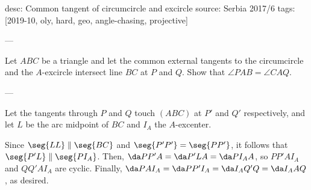 desc: Common tangent of circumcircle and excircle
source: Serbia 2017/6
tags: [2019-10, oly, hard, geo, angle-chasing, projective]

---

Let $ABC$ be a triangle and let the common external tangents to the circumcircle and the $A$-excircle intersect line $BC$ at $P$ and $Q$. Show that $\angle PAB=\angle CAQ$.

---

Let the tangents through $P$ and $Q$ touch $(ABC)$ at $P'$ and $Q'$ respectively, and let $L$ be the arc midpoint of $BC$ and $I_A$ the $A$-excenter.

Since $\seg{LL}\parallel\seg{BC}$ and $\seg{P'P'}=\seg{PP'}$, it follows that $\seg{P'L}\parallel\seg{PI_A}$. Then, $\da PP'A=\da P'LA=\da PI_AA$, so $PP'AI_A$ and $QQ'AI_A$ are cyclic. Finally, $\da PAI_A=\da PP'I_A=\da I_AQ'Q=\da I_AAQ$, as desired.

